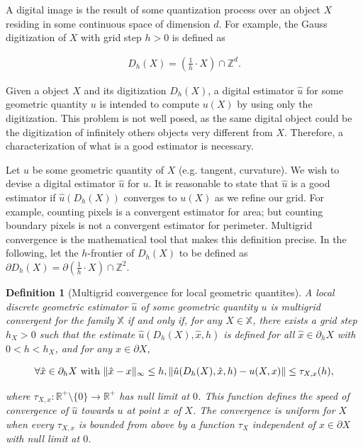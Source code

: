 \documentclass[runningheads]{llncs}
\newtheorem{ddef}{Definition}
\DeclarePairedDelimiter\norm{\lVert}{\rVert}%
\begin{document}
A digital image is the result of some quantization process over an object $X$ residing in some continuous space of dimension $d$.  For example, the Gauss digitization of $X$ with grid step $h>0$ is defined as

\begin{align*}
	D_h(X) = \left( \frac{1}{h} \cdot X \right) \cap \mathbb{Z}^d.
\end{align*} 

Given a object $X$ and its digitization $D_h(X)$, a digital estimator $\hat{u}$ for some geometric quantity $u$ is intended to compute $u(X)$ by using only the digitization. This problem is not well posed, as the same digital object could be the digitization of infinitely others objects very different from $X$. Therefore, a characterization of what is a good estimator is necessary.

Let $u$ be some geometric quantity of $X$ (e.g. tangent, curvature). We wish to devise a digital estimator $\hat{u}$ for $u$. It is reasonable to state that $\hat{u}$ is a good estimator if $\hat{u}(D_h(X))$ converges to $u(X)$ as we refine our grid. For example, counting pixels is a convergent estimator for area; but counting boundary pixels is not a convergent estimator for perimeter. Multigrid convergence is the mathematical tool that makes this definition precise. In the following, let the $h$-frontier of $D_h(X)$ to be defined as $\partial D_h(X) = \partial \left( \frac{1}{h} \cdot X \right) \cap \mathbb{Z}^2$.


	
	\begin{ddef}[Multigrid convergence for local geometric quantites]
		A local discrete geometric estimator $\hat{u}$ of some geometric quantity $u$ is multigrid convergent for the family $\mathbb{X}$ if and only if, for any $X \in \mathbb{X}$, there exists a grid step $h_X>0$ such that the estimate $\hat{u}(D_h(X),\hat{x},h)$ is defined for all $\hat{x} \in \partial_hX$ with $ 0 < h < h_X$, and for any $x \in \partial X$,
		
		\begin{equation}
			\forall \hat{x} \in  \partial_hX \text{ with } \norm{ \hat{x} - x }_{\infty} \leq h, \norm{ \hat{u}(D_h(X),\hat{x},h) - u(X,x)} \leq \tau_{X,x}(h),			
		\end{equation}
		
		where $\tau_{X,x}:\mathbb{R}^{+}\setminus\{0\} \rightarrow \mathbb{R}^{+}$ has null limit at $0$. This function defines the speed of convergence of $\hat{u}$ towards $u$ at point $x$ of $X$. The convergence is uniform for $X$ when every $\tau_{X,x}$ is bounded from above by a function $\tau_X$ independent of $x \in \partial X$ with null limit at $0$.
	\end{ddef}
	
\end{document}
